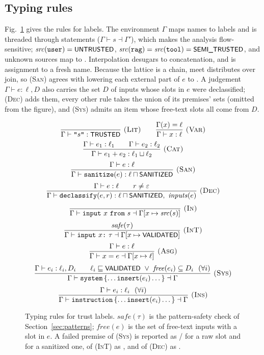 \documentclass[journal]{IEEEtran}
\begin{document}
\subsection{Typing rules}
Fig.~\ref{fig:rules} gives the rules for labels. The environment $\Gamma$ maps names to labels and is threaded through statements ($\Gamma \vdash s \dashv \Gamma'$), which makes the analysis flow-sensitive; $\mathit{src}(\texttt{user}) = \textsf{\small UNTRUSTED}$, $\mathit{src}(\texttt{rag}) = \mathit{src}(\texttt{tool}) = \textsf{\small SEMI\_TRUSTED}$, and unknown sources map to . Interpolation desugars to concatenation, and  is assignment to a fresh name. Because the lattice is a chain, meet distributes over join, so (\textsc{San}) agrees with lowering each external part of $e$ to . A judgement $\Gamma\vdash e:\ell,D$ also carries the set $D$ of inputs whose slots in $e$ were declassified; (\textsc{Dec}) adds them, every other rule takes the union of its premises' sets (omitted from the figure), and (\textsc{Sys}) admits an item whose free-text slots all come from $D$.

\begin{figure}[t]
\centering\footnotesize
\[
\frac{}{\Gamma \vdash \texttt{"}s\texttt{"} : \textsf{\small TRUSTED}}\ \textsc{(Lit)}
\qquad
\frac{\Gamma(x) = \ell}{\Gamma \vdash x : \ell}\ \textsc{(Var)}
\]
\[
\frac{\Gamma \vdash e_1 : \ell_1 \qquad \Gamma \vdash e_2 : \ell_2}{\Gamma \vdash e_1 + e_2 : \ell_1 \sqcup \ell_2}\ \textsc{(Cat)}
\]
\[
\frac{\Gamma \vdash e : \ell}{\Gamma \vdash \code{sanitize}(e) : \ell \sqcap \lab{SANITIZED}}\ \textsc{(San)}
\]
\[
\frac{\Gamma \vdash e : \ell \qquad r \neq \varepsilon}{\Gamma \vdash \code{declassify}(e, r) : \ell \sqcap \lab{SANITIZED},\ \mathit{inputs}(e)}\ \textsc{(Dec)}
\]
\[
\frac{}{\Gamma \vdash \texttt{input}\ x\ \texttt{from}\ s \dashv \Gamma[x \mapsto \mathit{src}(s)]}\ \textsc{(In)}
\]
\[
\frac{\mathit{safe}(\tau)}{\Gamma \vdash \texttt{input}\ x \texttt{:}\ \tau \dashv \Gamma[x \mapsto \textsf{\small VALIDATED}]}\ \textsc{(InT)}
\]
\[
\frac{\Gamma \vdash e : \ell}{\Gamma \vdash x = e \dashv \Gamma[x \mapsto \ell]}\ \textsc{(Asg)}
\]
\[
\frac{\Gamma \vdash e_i : \ell_i, D_i \qquad \ell_i \sqsubseteq \textsf{\small VALIDATED} \ \vee\ \mathit{free}(e_i) \subseteq D_i\ \ (\forall i)}{\Gamma \vdash \texttt{system}\,\{\dots \texttt{insert}(e_i) \dots\} \dashv \Gamma}\ \textsc{(Sys)}
\]
\[
\frac{\Gamma \vdash e_i : \ell_i\ \ (\forall i)}{\Gamma \vdash \texttt{instruction}\,\{\dots \texttt{insert}(e_i) \dots\} \dashv \Gamma}\ \textsc{(Ins)}
\]
\caption{Typing rules for trust labels. $\mathit{safe}(\tau)$ is the pattern-safety check of Section~\ref{sec:patterns}; $\mathit{free}(e)$ is the set of free-text inputs with a slot in $e$. A failed premise of (\textsc{Sys}) is reported as / for a raw slot and  for a sanitized one, of (\textsc{InT}) as , and of (\textsc{Dec}) as .}
\label{fig:rules}
\end{figure}
\end{document}
